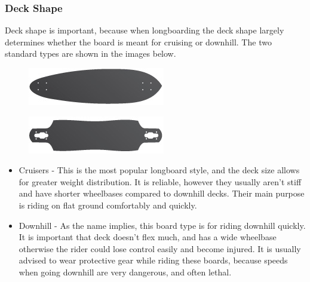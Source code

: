 \documentclass[letterpaper,12pt]{article}
\begin{document}
\subsubsection{Deck Shape}
Deck shape is important, because when longboarding the deck shape largely determines whether the board is meant for cruising or downhill. The two standard types are shown in the images below.
\begin{figure}[!htbp]\centering
\begin{minipage}{.5\textwidth}\centering
\includegraphics[width=.8\textwidth]{cruiser.jpg}
\label{cruiser}
\end{minipage}%
\begin{minipage}{.5\textwidth}\centering
\includegraphics[width=.8\textwidth]{downhill.jpg}
\label{downhill}
\end{minipage}
\end{figure}
\begin{itemize}
\item Cruisers - This is the most popular longboard style, and the deck size allows for greater weight distribution. It is reliable, however they usually aren't stiff and have shorter wheelbases compared to downhill decks. Their main purpose is riding on flat ground comfortably and quickly.

\item Downhill - As the name implies, this board type is for riding downhill quickly. It is important that deck doesn't flex much, and has a wide wheelbase otherwise the rider could lose control easily and become injured. It is usually advised to wear protective gear while riding these boards, because speeds when going downhill are very dangerous, and often lethal.

\end{itemize}
\end{document}

